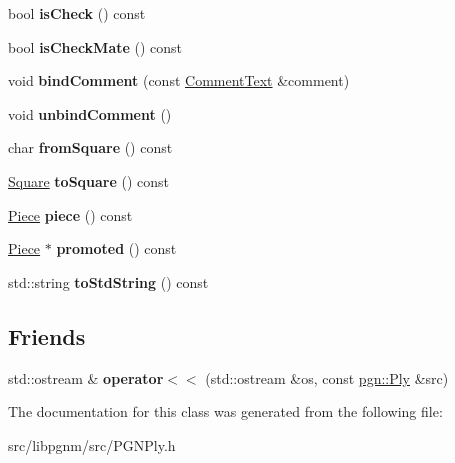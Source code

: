 \begin{DoxyCompactItemize}
\item 
\hypertarget{classpgn_1_1Ply_aaef23816e7ae0bd8483e244d74a831a3}{
bool {\bfseries isCheck} () const }
\label{classpgn_1_1Ply_aaef23816e7ae0bd8483e244d74a831a3}

\item 
\hypertarget{classpgn_1_1Ply_a3fc793753433373ca1efc864c18a8ad3}{
bool {\bfseries isCheckMate} () const }
\label{classpgn_1_1Ply_a3fc793753433373ca1efc864c18a8ad3}

\item 
\hypertarget{classpgn_1_1Ply_a83d8ab3e980deb619f063432dfed59b5}{
void {\bfseries bindComment} (const \hyperlink{classpgn_1_1CommentText}{CommentText} \&comment)}
\label{classpgn_1_1Ply_a83d8ab3e980deb619f063432dfed59b5}

\item 
\hypertarget{classpgn_1_1Ply_a9858d87d0e386888115639eebd595f8a}{
void {\bfseries unbindComment} ()}
\label{classpgn_1_1Ply_a9858d87d0e386888115639eebd595f8a}

\item 
\hypertarget{classpgn_1_1Ply_a1ffe8bb29a5ac3d0c2ab0d3004aaddd3}{
char {\bfseries fromSquare} () const }
\label{classpgn_1_1Ply_a1ffe8bb29a5ac3d0c2ab0d3004aaddd3}

\item 
\hypertarget{classpgn_1_1Ply_ab345f182919aed0853073f1e7b6e88a6}{
\hyperlink{classpgn_1_1Square}{Square} {\bfseries toSquare} () const }
\label{classpgn_1_1Ply_ab345f182919aed0853073f1e7b6e88a6}

\item 
\hypertarget{classpgn_1_1Ply_adaea7928bf1655338ca0fd33c7c2000d}{
\hyperlink{classpgn_1_1Piece}{Piece} {\bfseries piece} () const }
\label{classpgn_1_1Ply_adaea7928bf1655338ca0fd33c7c2000d}

\item 
\hypertarget{classpgn_1_1Ply_a1417080779131decd88bbafe412e5e89}{
\hyperlink{classpgn_1_1Piece}{Piece} $\ast$ {\bfseries promoted} () const }
\label{classpgn_1_1Ply_a1417080779131decd88bbafe412e5e89}

\item 
\hypertarget{classpgn_1_1Ply_a2985fc89a6f181995a93a142d85ed342}{
std::string {\bfseries toStdString} () const }
\label{classpgn_1_1Ply_a2985fc89a6f181995a93a142d85ed342}

\end{DoxyCompactItemize}
\subsection*{Friends}
\begin{DoxyCompactItemize}
\item 
\hypertarget{classpgn_1_1Ply_a06d0e8fc52490f084fd1ab25a443790a}{
std::ostream \& {\bfseries operator$<$$<$} (std::ostream \&os, const \hyperlink{classpgn_1_1Ply}{pgn::Ply} \&src)}
\label{classpgn_1_1Ply_a06d0e8fc52490f084fd1ab25a443790a}

\end{DoxyCompactItemize}


The documentation for this class was generated from the following file:\begin{DoxyCompactItemize}
\item 
src/libpgnm/src/PGNPly.h\end{DoxyCompactItemize}
